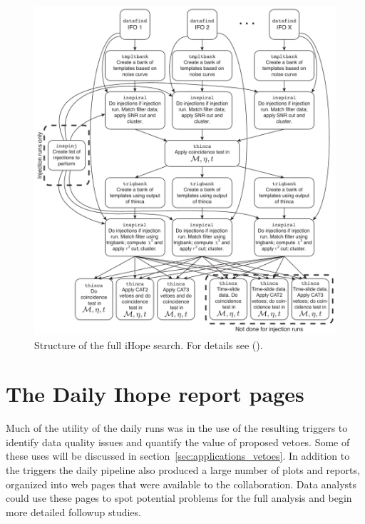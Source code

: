\begin{figure}
  \includegraphics[width=\linewidth]{figures/detchar/HIPEDiagram}
  \caption[Structure of the full iHope search]{
  \label{f:hipe}
Structure of the full iHope search.  For details see ().
}
\end{figure}%



\section{The Daily Ihope report pages}

Much of the utility of the daily runs was in the use of the resulting
triggers to identify data quality issues and quantify the value of
proposed vetoes.  Some of these uses will be discussed in
section~\ref{sec:applications_vetoes}.  In addition to the triggers
the daily pipeline also produced a large number of plots and reports,
organized into web pages that were available to the collaboration.
Data analysts could use these pages to spot potential problems for the
full analysis and begin more detailed followup studies.  

